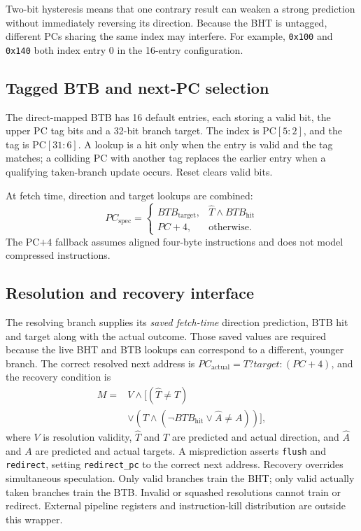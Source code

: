 \documentclass[conference,a4paper]{IEEEtran}
\begin{document}
Two-bit hysteresis means that one contrary result can weaken a strong prediction without immediately reversing its direction. Because the BHT is untagged, different PCs sharing the same index may interfere. For example, \texttt{0x100} and \texttt{0x140} both index entry 0 in the 16-entry configuration.

\subsection{Tagged BTB and next-PC selection}
The direct-mapped BTB has 16 default entries, each storing a valid bit, the upper PC tag bits and a 32-bit branch target. The index is PC$[5:2]$, and the tag is PC$[31:6]$. A lookup is a hit only when the entry is valid and the tag matches; a colliding PC with another tag replaces the earlier entry when a qualifying taken-branch update occurs. Reset clears valid bits.

At fetch time, direction and target lookups are combined:
\begin{equation}
PC_{\mathrm{spec}}=\begin{cases}
BTB_{\mathrm{target}},&\hat{T}\wedge BTB_{\mathrm{hit}}\\
PC+4,&\text{otherwise.}
\end{cases}
\label{eq:nextpc}
\end{equation}
The PC$+4$ fallback assumes aligned four-byte instructions and does not model compressed instructions.

\subsection{Resolution and recovery interface}
The resolving branch supplies its \emph{saved fetch-time} direction prediction, BTB hit and target along with the actual outcome. Those saved values are required because the live BHT and BTB lookups can correspond to a different, younger branch. The correct resolved next address is $PC_{\mathrm{actual}}=T?target:(PC+4)$, and the recovery condition is
\begin{equation}
\begin{split}
M={}&V\land\big[(\hat{T}\ne T)\\
&\lor(T\land(\neg BTB_{\mathrm{hit}}\lor\hat{A}\ne A))\big],
\end{split}
\label{eq:mispredict}
\end{equation}
where $V$ is resolution validity, $\hat{T}$ and $T$ are predicted and actual direction, and $\hat{A}$ and $A$ are predicted and actual targets. A misprediction asserts \texttt{flush} and \texttt{redirect}, setting \texttt{redirect\_pc} to the correct next address. Recovery overrides simultaneous speculation. Only valid branches train the BHT; only valid actually taken branches train the BTB. Invalid or squashed resolutions cannot train or redirect. External pipeline registers and instruction-kill distribution are outside this wrapper.
\end{document}
